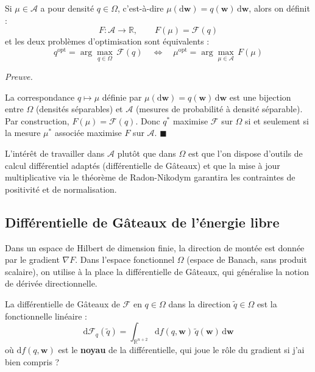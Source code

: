 \documentclass[12pt]{article}
\newcommand{\w}{\boldsymbol{w}}
\renewcommand{\qedsymbol}{$\blacksquare$}
\renewenvironment{proof}[1][\proofname]{%
  \par\medskip\noindent
  \textit{\color{proofgray}#1.}\enspace\ignorespaces
}{\hfill\qedsymbol\par\medskip}
\renewcommand{\proofname}{Preuve}
\begin{document}
\begin{propositionbox}
\label{prop:equiv_opt}
Si $\mu \in \mathcal{A}$ a pour densité $q \in \Omega$, c'est-à-dire $\mu(\mathrm{d}\w) = q(\w)\,\mathrm{d}\w$, alors on définit 
:
\[
F : \mathcal{A} \to \mathbb{R}, \qquad F(\mu) = \mathcal{F}(q)
\]
et les deux problèmes d'optimisation sont équivalents 
:
\begin{equation}
    \boxed{q^{\mathrm{opt}} = \arg\max_{q \in \Omega}\, \mathcal{F}(q) \quad \Longleftrightarrow \quad \mu^{\mathrm{opt}} = \arg\max_{\mu \in \mathcal{A}}\, F(\mu)}
\end{equation}
\end{propositionbox}

\begin{proof}


La correspondance $q \mapsto \mu$ définie par $\mu(\mathrm{d}\w) = q(\w)\,\mathrm{d}\w$ est une bijection entre $\Omega$ (densités séparables) et $\mathcal{A}$ (mesures de probabilité à densité séparable). Par construction, $F(\mu) = \mathcal{F}(q)$. Donc $q^*$ maximise $\mathcal{F}$ sur $\Omega$ si et seulement si la mesure $\mu^*$ associée maximise $F$ sur $\mathcal{A}$.
\end{proof}

L'intérêt de travailler dans $\mathcal{A}$ plutôt que dans $\Omega$ est que l'on dispose d'outils de calcul différentiel adaptés (différentielle de Gâteaux) et que la mise à jour multiplicative via le théorème de Radon-Nikodym garantira les contraintes de positivité et de normalisation.


\subsection{Différentielle de Gâteaux de l'énergie libre}

Dans un espace de Hilbert de dimension finie, la direction de montée est donnée par le gradient $\nabla F$. Dans l'espace fonctionnel $\Omega$ (espace de Banach, sans produit scalaire), on utilise à la place la différentielle de Gâteaux, qui généralise la notion de dérivée directionnelle.

\begin{definitionbox}
\label{def:gateaux}
La différentielle de Gâteaux de $\mathcal{F}$ en $q \in \Omega$ dans la direction $\tilde{q} \in \Omega$ est la fonctionnelle linéaire 
:
\begin{equation}
    \mathrm{d}\mathcal{F}_q(\tilde{q}) = \int_{\mathbb{R}^{n+2}} \mathrm{d}f(q, \w)\, \tilde{q}(\w)\, \mathrm{d}\w
\end{equation}
où $\mathrm{d}f(q, \w)$ est le \textbf{noyau} de la différentielle, qui joue le rôle du gradient si j'ai bien compris ?
\end{definitionbox}
\end{document}

